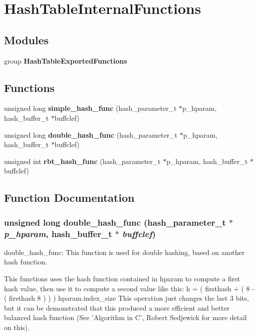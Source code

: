 \section{Hash\-Table\-Internal\-Functions}
\label{group__HashTableInternalFunctions}
\subsection*{Modules}
\begin{CompactItemize}
\item 
group {\bf Hash\-Table\-Exported\-Functions}
\end{CompactItemize}
\subsection*{Functions}
\begin{CompactItemize}
\item 
unsigned long {\bf simple\_\-hash\_\-func} (hash\_\-parameter\_\-t $\ast$p\_\-hparam, hash\_\-buffer\_\-t $\ast$buffclef)
\item 
unsigned long {\bf double\_\-hash\_\-func} (hash\_\-parameter\_\-t $\ast$p\_\-hparam, hash\_\-buffer\_\-t $\ast$buffclef)
\item 
unsigned int {\bf rbt\_\-hash\_\-func} (hash\_\-parameter\_\-t $\ast$p\_\-hparam, hash\_\-buffer\_\-t $\ast$buffclef)
\end{CompactItemize}


\subsection{Function Documentation}
\subsubsection{\setlength{\rightskip}{0pt plus 5cm}unsigned long double\_\-hash\_\-func (hash\_\-parameter\_\-t $\ast$ {\em p\_\-hparam}, hash\_\-buffer\_\-t $\ast$ {\em buffclef})}\label{group__HashTableInternalFunctions_ga1}


double\_\-hash\_\-func: This function is used for double hashing, based on another hash function.

This functions uses the hash function contained in hparam to compute a first hash value, then use it to compute a second value like this: h = ( firsthash + ( 8 - ( firsthash  8 ) ) )  hparam.index\_\-size This operation just changes the last 3 bits, but it can be demonstrated that this produced a more efficient and better balanced hash function (See 'Algorithm in C', Robert Sedjewick for more detail on this).

